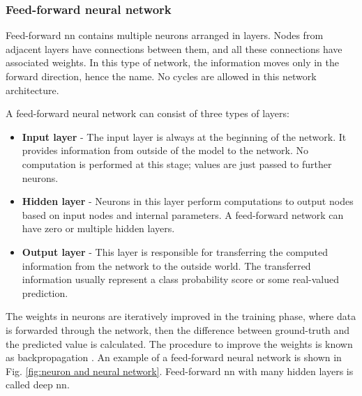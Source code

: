         \subsubsection{Feed-forward neural network}
            Feed-forward \gls{nn} contains multiple neurons arranged in layers. Nodes from adjacent layers have connections between them, and all these connections have associated weights. In this type of network, the information moves only in the forward direction, hence the name. No cycles are allowed in this network architecture.
            
            A feed-forward neural network can consist of three types of layers:
            
            \begin{itemize}
                \item \textbf{Input layer} - The input layer is always at the beginning of the network. It provides information from outside of the model to the network. No computation is performed at this stage; values are just passed to further neurons.
                \item \textbf{Hidden layer} - Neurons in this layer perform computations to output nodes based on input nodes and internal parameters. A feed-forward network can have zero or multiple hidden layers.
                \item \textbf{Output layer} - This layer is responsible for transferring the computed information from the network to the outside world. The transferred information usually represent a class probability score or some real-valued prediction.
            \end{itemize}
           
            The weights in neurons are iteratively improved in the training phase, where data is forwarded through the network,  then the difference between ground-truth and the predicted value is calculated. The procedure to improve the weights is known as backpropagation \cite{hecht1992theory}.  An example of a feed-forward neural network is shown in Fig. \ref{fig:neuron and neural network}. Feed-forward \gls{nn} with many hidden layers is called deep \gls{nn}.

